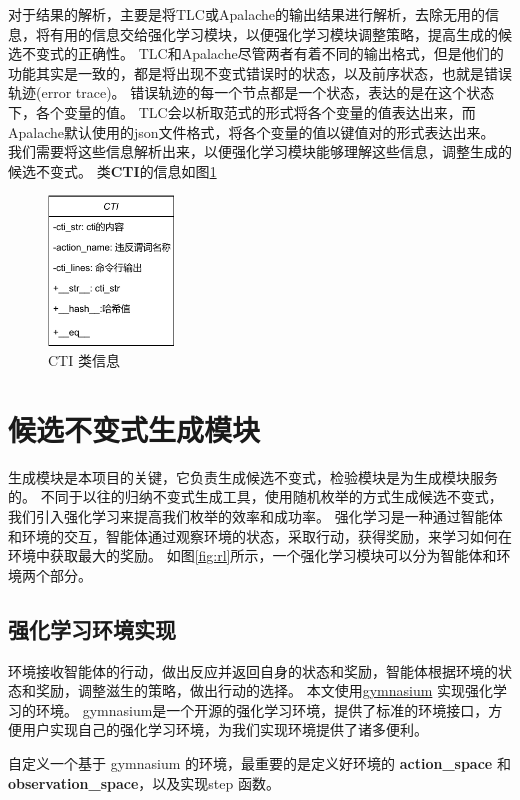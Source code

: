 对于结果的解析，主要是将TLC或Apalache的输出结果进行解析，去除无用的信息，将有用的信息交给强化学习模块，以便强化学习模块调整策略，提高生成的候选不变式的正确性。
TLC和Apalache尽管两者有着不同的输出格式，但是他们的功能其实是一致的，都是将出现不变式错误时的状态，以及前序状态，也就是错误轨迹(error trace)。
错误轨迹的每一个节点都是一个状态，表达的是在这个状态下，各个变量的值。
TLC会以析取范式的形式将各个变量的值表达出来，而Apalache默认使用的json文件格式，将各个变量的值以键值对的形式表达出来。
我们需要将这些信息解析出来，以便强化学习模块能够理解这些信息，调整生成的候选不变式。
类\textbf{CTI}的信息如图\ref{fig:class_cti}
\begin{figure}[h]
    \centering
    \includegraphics[width=0.3\textwidth]{figures/class_cti.pdf}
    \caption{CTI 类信息}
    \label{fig:class_cti}
\end{figure}
\section{候选不变式生成模块}

生成模块是本项目的关键，它负责生成候选不变式，检验模块是为生成模块服务的。
不同于以往的归纳不变式生成工具，使用随机枚举的方式生成候选不变式，我们引入强化学习来提高我们枚举的效率和成功率。
强化学习是一种通过智能体和环境的交互，智能体通过观察环境的状态，采取行动，获得奖励，来学习如何在环境中获取最大的奖励。
如图\ref{fig:rl}所示，一个强化学习模块可以分为智能体和环境两个部分。

\subsection{强化学习环境实现}

环境接收智能体的行动，做出反应并返回自身的状态和奖励，智能体根据环境的状态和奖励，调整滋生的策略，做出行动的选择。
本文使用\href{https://gymnasium.farama.org/}{gymnasium} \cite{gymnasium} 实现强化学习的环境。
gymnasium是一个开源的强化学习环境，提供了标准的环境接口，方便用户实现自己的强化学习环境，为我们实现环境提供了诸多便利。

自定义一个基于 gymnasium 的环境，最重要的是定义好环境的 \textbf{action\_space} 和 \textbf{observation\_space}，以及实现step 函数。

